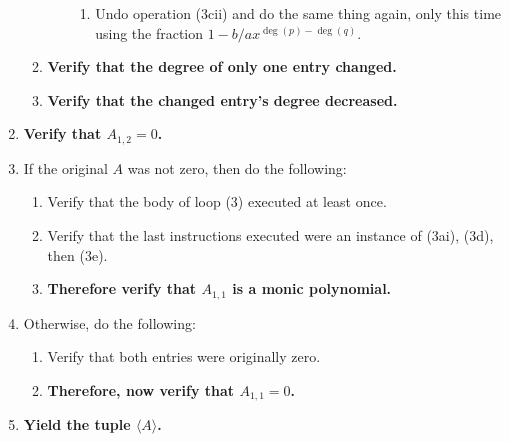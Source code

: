 \documentclass[twocolumn]{article}
\begin{document}
\begin{enumerate}
\begin{enumerate}
\begin{enumerate}
\begin{enumerate}
							\item Undo operation (3cii) and do the same thing again, only this time using the fraction $1-b/ax^{\deg(p)-\deg(q)}$.
						\end{enumerate}
					\end{enumerate}
					\item \textbf{Verify that the degree of only one entry changed.}
					\item \textbf{Verify that the changed entry's degree decreased.}
				\end{enumerate}
				\item \textbf{Verify that $A_{1,2}=0$.}
				\item If the original $A$ was not zero, then do the following:
				\begin{enumerate}
					\item Verify that the body of loop (3) executed at least once.
					\item Verify that the last instructions executed were an instance of (3ai), (3d), then (3e).
					\item \textbf{Therefore verify that $A_{1,1}$ is a monic polynomial.}
				\end{enumerate}
				\item Otherwise, do the following:
				\begin{enumerate}
					\item Verify that both entries were originally zero.
					\item \textbf{Therefore, now verify that $A_{1,1}=0$.}
				\end{enumerate}
				\item \textbf{Yield the tuple $\langle A\rangle$.}
			\end{enumerate}
\end{document}
